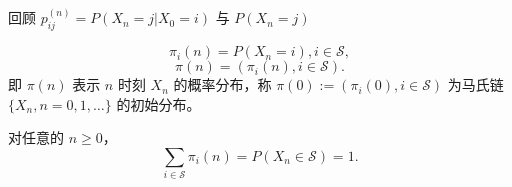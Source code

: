 \documentclass[lang=cn,10pt,thmcnt=section]{elegantbook}
\begin{document}
回顾 $p_{ij}^{(n)} = P(X_n = j | X_0 = i)$ 与 $P(X_n = j)$

\[
\pi_i(n) = P(X_n = i), i \in \mathcal{S},
\]
\[
\pi(n) = (\pi_i(n), i \in \mathcal{S}).
\]
即 $\pi(n)$ 表示 $n$ 时刻 $X_n$ 的概率分布，称 $\pi(0) := (\pi_i(0), i \in \mathcal{S})$ 为马氏链 $\{X_n, n = 0, 1, \ldots\}$ 的初始分布。

对任意的 $n \geq 0$，
\[
\sum_{i \in \mathcal{S}} \pi_i(n) = P(X_n \in \mathcal{S}) = 1.
\]
\end{document}
